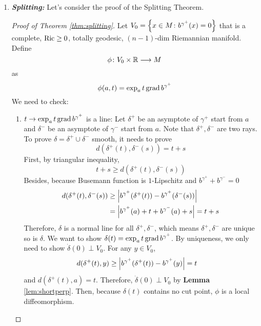 \begin{enumerate}[label=\arabic{*}.]
	\item \emph{\textbf{Splitting:}} Let's consider the proof of the Splitting Theorem.
	\begin{proof}[Proof of Theorem \ref{thm:splitting}]
		Let $V_0 = \left\{x \in M \colon b^{\gamma^+}(x) = 0\right\}$ that is a complete, $\operatorname{Ric} \geq 0$, totally geodesic, $(n-1)$-dim Riemannian manifold. Define
		\begin{equation*}
			\phi \colon V_0 \times \mathbb{R} \longrightarrow M
		\end{equation*}
		as
		\begin{equation*}
			\phi(a,t) = \exp_a t\operatorname{grad}b^{\gamma^+}
		\end{equation*}
		We need to check:
		\begin{enumerate}[label=\Roman*.]
			\item $t \rightarrow \exp_a t\operatorname{grad}b^{\gamma^+}$ is a line: Let $\delta^+$ be an asymptote of $\gamma^+$ start from $a$ and $\delta^-$ be an asymptote of $\gamma^-$ start from $a$. Note that $\delta^+,\delta^-$ are two rays. To prove $\delta = \delta^+ \cup \delta^-$ smooth, it needs to prove
			\begin{equation*}
				d(\delta^+(t),\delta^-(s)) = t+s
			\end{equation*}
			First, by triangular inequality,
			\begin{equation*}
				t+s \geq d(\delta^+(t),\delta^-(s))
			\end{equation*}
			Besides, because Busemann function is $1$-Lipschitz and $b^{\gamma^+} + b^{\gamma^-} = 0$
			\begin{equation*}
				\begin{aligned}
					d(\delta^+(t),\delta^-(s)) &\geq \left\lvert b^{\gamma^+}(\delta^+(t)) - b^{\gamma^+}(\delta^-(s))\right\lvert\\ 
					&= \left\lvert b^{\gamma^+}(a)+t + b^{\gamma^-}(a) + s\right\lvert = t+s
				\end{aligned}
			\end{equation*}
			Therefore, $\delta$ is a normal line for all $\delta^+,\delta^-$, which means $\delta^+,\delta^-$ are unique so is $\delta$. We want to show $\delta(t) = \exp_a t\operatorname{grad}b^{\gamma^+}$. By uniqueness, we only need to show $\dot{\delta}(0) \perp V_0$.  For any $y \in V_0$,
			\begin{equation*}
				\begin{aligned}
					d(\delta^+(t),y) &\geq \left\lvert b^{\gamma^+}(\delta^+(t)) - b^{\gamma^+}(y)\right\lvert = t
				\end{aligned}
			\end{equation*}
			and $d(\delta^+(t),a) = t$. Therefore, $\dot{\delta}(0) \perp V_0$ by \textbf{Lemma} \ref{lem:shortperp}. Then, because $\delta(t)$ contains no cut point, $\phi$ is a local diffeomorphism.
 			

\end{enumerate}
\end{proof}
\end{enumerate}
